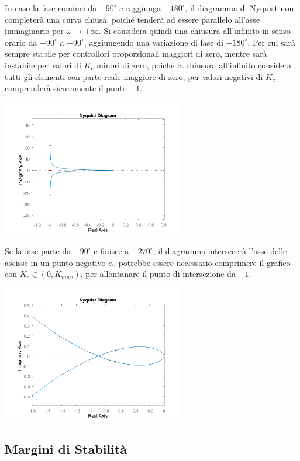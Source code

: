 \documentclass{article}
\numberwithin{equation}{subsection}
\begin{document}
In caso la fase cominci da $-90^{\circ}$ e raggiunga $-180^{\circ}$, il diagramma di Nyquist non completerà una curva chiusa, poiché tenderà ad essere parallelo all'asse 
immaginario per $\omega\to\pm\infty$. Si considera quindi una chiusura all'infinito in senso orario da $+90^{\circ}$ a $-90^{\circ}$, aggiungendo una variazione 
di fase di $-180^{\circ}$. Per cui sarà sempre stabile per controllori proporzionali maggiori di zero, mentre sarà instabile per valori di $K_c$ minori di zero, poiché 
la chiusura all'infinito considera tutti gli elementi con parte reale maggiore di zero, per valori negativi di $K_c$ comprenderà sicuramente il punto $-1$. 

\begin{center}
    \includegraphics[width=8cm]{Nyquist3.png}
\end{center}

Se la fase parte da $-90^{\circ}$ e finisce a $-270^{\circ}$, il diagramma intersecerà l'asse delle ascisse in un punto negativo $\alpha$, potrebbe essere necessario comprimere 
il grafico con $K_c\in(0,K_{max})$, per allontanare il punto di intersezione da $-1$. 

\begin{center}
    \includegraphics[width=8cm]{Nyquist4.png}
\end{center}

\subsection{Margini di Stabilità}
\end{document}
